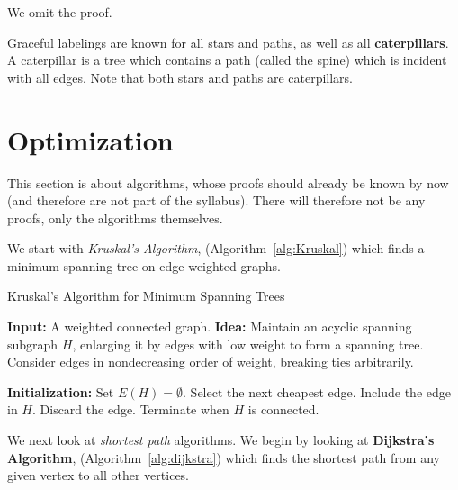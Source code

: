 We omit the proof.

Graceful labelings are known for all stars and paths, as well as all \textbf{caterpillars}. A caterpillar is a tree which contains a path (called the spine) which is incident with all edges. Note that both stars and paths are caterpillars.

\section{Optimization}%
\label{sec:2.3}

This section is about algorithms, whose proofs should already be known by now (and therefore are not part of the syllabus). There will therefore not be any proofs, only the algorithms themselves.

We start with \textit{Kruskal's Algorithm}, (Algorithm~\ref{alg:Kruskal}) which finds a minimum spanning tree on edge-weighted graphs.

\begin{algorithm}
	\caption{\label{alg:Kruskal}Kruskal's Algorithm for Minimum Spanning Trees}
	\begin{algorithmic}[1]
		\STATE \textbf{Input:} A weighted connected graph.
		\STATE \textbf{Idea:} Maintain an acyclic spanning subgraph $H$, enlarging it by edges with low weight to form a spanning tree.
		\STATE Consider edges in nondecreasing order of weight, breaking ties arbitrarily.

		\STATE \textbf{Initialization:} Set $E(H) = \emptyset$.
		\STATE Select the next cheapest edge.
		\STATE Include the edge in $H$.
		\ELSE
		\STATE Discard the edge.
		\ENDIF
		\ENDWHILE
		\STATE Terminate when $H$ is connected.
	\end{algorithmic}
\end{algorithm}

We next look at \textit{shortest path} algorithms. We begin by looking at \textbf{Dijkstra's Algorithm}, (Algorithm~\ref{alg:dijkstra}) which finds the shortest path from any given vertex to all other vertices.


